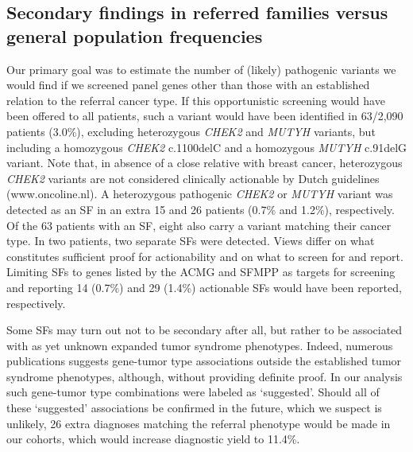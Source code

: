 \subsection{Secondary findings in referred families versus general population frequencies }
Our primary goal was to estimate the number of (likely) pathogenic variants we would find if we screened panel genes other than those with an established relation to the referral cancer type. 
If this opportunistic screening would have been offered to all patients, such a variant would have been identified in 63/2,090 patients (3.0\%), excluding heterozygous \textsl{CHEK2} and \textsl{MUTYH} variants, but including a homozygous \textsl{CHEK2} c.1100delC and a homozygous \textsl{MUTYH} c.91delG variant. 
Note that, in absence of a close relative with breast cancer, heterozygous \textsl{CHEK2} variants are not considered clinically actionable by Dutch guidelines (www.oncoline.nl). 
A heterozygous pathogenic \textsl{CHEK2} or \textsl{MUTYH} variant was detected as an SF in an extra 15 and 26 patients (0.7\% and 1.2\%), respectively. 
Of the 63 patients with an SF, eight also carry a variant matching their cancer type. In two patients, two separate SFs were detected. 
Views differ on what constitutes sufficient proof for actionability and on what to screen for and report. 
Limiting SFs to genes listed by the ACMG and SFMPP as targets for screening and reporting 14 (0.7\%) and 29 (1.4\%) actionable SFs would have been reported, respectively. 

Some SFs may turn out not to be secondary after all, but rather to be associated with as yet unknown expanded tumor syndrome phenotypes. 
Indeed, numerous publications suggests gene-tumor type associations outside the established tumor syndrome phenotypes, although, without providing definite proof. 
In our analysis such gene-tumor type combinations were labeled as ‘suggested’. 
Should all of these ‘suggested’ associations be confirmed in the future, which we suspect is unlikely, 26 extra diagnoses matching the referral phenotype would be made in our cohorts, which would increase diagnostic yield to 11.4\%. 


